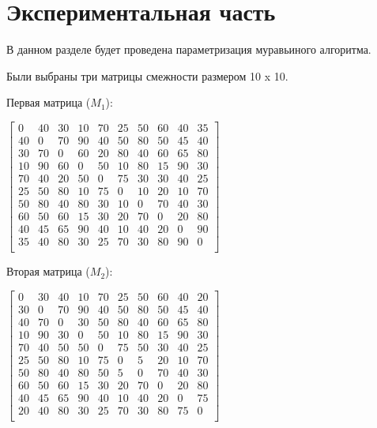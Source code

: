 \documentclass[a4paper,14pt]{report}
\begin{document}
\chapter*{Экспериментальная часть}

В данном разделе будет проведена параметризация муравьиного алгоритма.

Были выбраны три матрицы смежности размером 10 x 10.

Первая матрица ($M_{1}$):

$\begin{bmatrix}
0 & 40 & 30 & 10 & 70 & 25 & 50 & 60 & 40 & 35 \\
40 & 0 & 70 & 90 & 40 & 50 & 80 & 50 & 45 & 40 \\
30 & 70 & 0 & 60 & 20 & 80 & 40 & 60 & 65 & 80 \\
10 & 90 & 60 & 0 & 50 & 10 & 80 & 15 & 90 & 30 \\
70 & 40 & 20 & 50 & 0 & 75 & 30 & 30 & 40 & 25 \\
25 & 50 & 80 & 10 & 75 & 0 & 10 & 20 & 10 & 70 \\
50 & 80 & 40 & 80 & 30 & 10 & 0 & 70 & 40 & 30 \\
60 & 50 & 60 & 15 & 30 & 20 & 70 & 0 & 20 & 80 \\
40 & 45 & 65 & 90 & 40 & 10 & 40 & 20 & 0 & 90 \\
35 & 40 & 80 & 30 & 25 & 70 & 30 & 80 & 90 & 0 \\
\end{bmatrix}$

Вторая матрица ($M_{2}$):

$\begin{bmatrix}
0 & 30 & 40 & 10 & 70 & 25 & 50 & 60 & 40 & 20 \\
30 & 0 & 70 & 90 & 40 & 50 & 80 & 50 & 45 & 40 \\
40 & 70 & 0 & 30 & 50 & 80 & 40 & 60 & 65 & 80 \\
10 & 90 & 30 & 0 & 50 & 10 & 80 & 15 & 90 & 30 \\
70 & 40 & 50 & 50 & 0 & 75 & 50 & 30 & 40 & 25 \\
25 & 50 & 80 & 10 & 75 & 0 & 5 & 20 & 10 & 70 \\
50 & 80 & 40 & 80 & 50 & 5 & 0 & 70 & 40 & 30 \\
60 & 50 & 60 & 15 & 30 & 20 & 70 & 0 & 20 & 80 \\
40 & 45 & 65 & 90 & 40 & 10 & 40 & 20 & 0 & 75 \\
20 & 40 & 80 & 30 & 25 & 70 & 30 & 80 & 75 & 0 \\
\end{bmatrix}$
\end{document}
